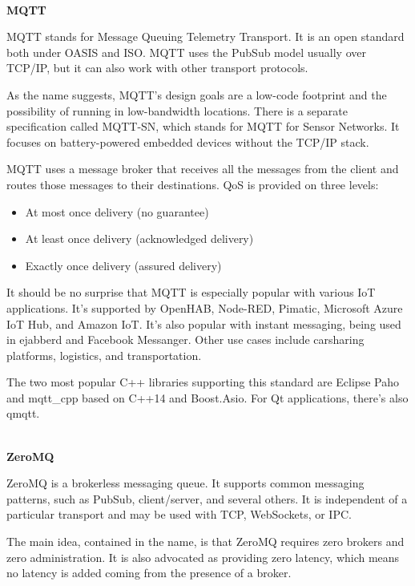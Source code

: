 \hspace*{\fill} \\ %
\noindent
\textbf{MQTT}

MQTT stands for Message Queuing Telemetry Transport. It is an open standard both under OASIS and ISO. MQTT uses the PubSub model usually over TCP/IP, but it can also work with other transport protocols.

As the name suggests, MQTT's design goals are a low-code footprint and the possibility of running in low-bandwidth locations. There is a separate specification called MQTT-SN, which stands for MQTT for Sensor Networks. It focuses on battery-powered embedded devices without the TCP/IP stack.

MQTT uses a message broker that receives all the messages from the client and routes those messages to their destinations. QoS is provided on three levels:

\begin{itemize}
\item 
At most once delivery (no guarantee)

\item 
At least once delivery (acknowledged delivery)

\item 
Exactly once delivery (assured delivery)
\end{itemize}

It should be no surprise that MQTT is especially popular with various IoT applications. It's supported by OpenHAB, Node-RED, Pimatic, Microsoft Azure IoT Hub, and Amazon IoT. It's also popular with instant messaging, being used in ejabberd and Facebook Messanger. Other use cases include carsharing platforms, logistics, and transportation.

The two most popular C++ libraries supporting this standard are Eclipse Paho and mqtt\_cpp based on C++14 and Boost.Asio. For Qt applications, there's also qmqtt.

\hspace*{\fill} \\ %
\noindent
\textbf{ZeroMQ}

ZeroMQ is a brokerless messaging queue. It supports common messaging patterns, such as PubSub, client/server, and several others. It is independent of a particular transport and may be used with TCP, WebSockets, or IPC.

The main idea, contained in the name, is that ZeroMQ requires zero brokers and zero administration. It is also advocated as providing zero latency, which means no latency is added coming from the presence of a broker.

